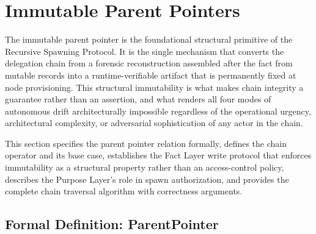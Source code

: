 \section{Immutable Parent Pointers}
\label{sec:immutable-parent-pointers}

The immutable parent pointer is the foundational structural primitive of the Recursive Spawning Protocol. It is the single mechanism that converts the delegation chain from a forensic reconstruction assembled after the fact from mutable records into a runtime-verifiable artifact that is permanently fixed at node provisioning. This structural immutability is what makes chain integrity a guarantee rather than an assertion, and what renders all four modes of autonomous drift architecturally impossible regardless of the operational urgency, architectural complexity, or adversarial sophistication of any actor in the chain.

This section specifies the parent pointer relation formally, defines the chain operator and its base case, establishes the Fact Layer write protocol that enforces immutability as a structural property rather than an access-control policy, describes the Purpose Layer's role in spawn authorization, and provides the complete chain traversal algorithm with correctness arguments.

\subsection{Formal Definition: ParentPointer}
\label{sec:parent-pointer-definition}


